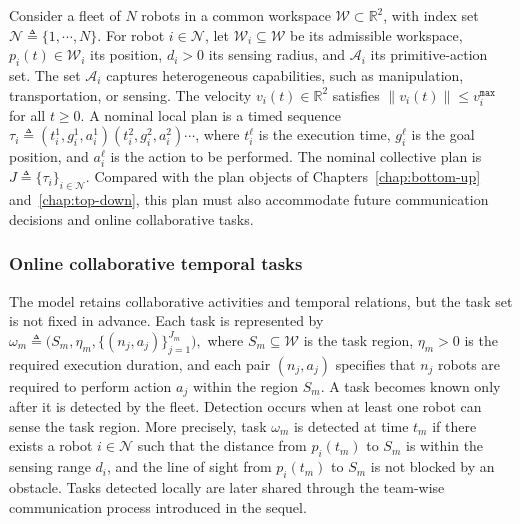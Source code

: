 Consider a fleet of $N$ robots in a common workspace
$\mathcal{W} \subset \mathbb{R}^2$, with index set
$\mathcal{N} \triangleq \{1, \cdots, N\}$. For robot
$i \in \mathcal{N}$, let $\mathcal{W}_i \subseteq \mathcal{W}$ be its
admissible workspace, $p_i(t) \in \mathcal{W}_i$ its position,
$d_i > 0$ its sensing radius, and $\mathcal{A}_i$ its primitive-action set.
The set $\mathcal{A}_i$ captures heterogeneous capabilities, such as
manipulation, transportation, or sensing. The velocity
$v_i(t) \in \mathbb{R}^2$ satisfies
$\|v_i(t)\| \leq v_i^{\texttt{max}}$ for all $t \geq 0$.
A nominal local plan is a timed sequence
$\tau_i \triangleq (t_i^1, g_i^1, a_i^1)(t_i^2, g_i^2, a_i^2)\cdots$,
where $t_i^\ell$ is the execution time, $g_i^\ell$ is the goal position, and
$a_i^\ell$ is the action to be performed. The nominal collective plan is
$J \triangleq \{\tau_i\}_{i \in \mathcal{N}}$. Compared with the plan objects
of Chapters~\ref{chap:bottom-up} and~\ref{chap:top-down}, this plan must also
accommodate future communication decisions and online collaborative tasks.

\subsubsection{Online collaborative temporal tasks}
\label{ch05:subsec:task-spec}

The model retains collaborative activities and temporal relations, but the task
set is not fixed in advance.  Each task is represented by
$
\omega_m \triangleq
\bigl(S_m, \eta_m, \{(n_j, a_j)\}_{j=1}^{J_m}\bigr),
$
where $S_m \subseteq \mathcal{W}$ is the task region, $\eta_m > 0$ is the
required execution duration, and each pair $(n_j, a_j)$ specifies that $n_j$
robots are required to perform action $a_j$ within the region $S_m$.
A task becomes known only after it is detected by the fleet. Detection occurs
when at least one robot can sense the task region. More precisely, task
$\omega_m$ is detected at time $t_m$ if there exists a robot
$i \in \mathcal{N}$ such that the distance from $p_i(t_m)$ to $S_m$ is within
the sensing range $d_i$, and the line of sight from $p_i(t_m)$ to $S_m$ is not
blocked by an obstacle. Tasks detected locally are later shared through the
team-wise communication process introduced in the sequel.

